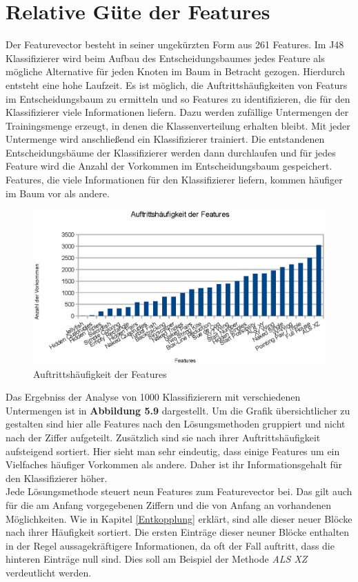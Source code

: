 \newpage
\section{Relative Güte der Features}
Der Featurevector besteht in seiner ungekürzten Form aus 261 Features. Im J48 Klassifizierer wird beim Aufbau des Entscheidungsbaumes jedes Feature als mögliche Alternative für jeden Knoten im Baum in Betracht gezogen. Hierdurch entsteht eine hohe Laufzeit. Es ist möglich, die Auftrittshäufigkeiten von Featurs im Entscheidungsbaum zu ermitteln und so Features zu identifizieren, die für den Klassifizierer viele Informationen liefern. Dazu werden zufällige Untermengen der Trainingsmenge erzeugt, in denen die Klassenverteilung erhalten bleibt. Mit jeder Untermenge wird anschließend ein Klassifizierer trainiert. Die entstandenen Entscheidungsbäume der Klassifizierer werden dann durchlaufen und für jedes Feature wird die Anzahl der Vorkommen im Entscheidungsbaum gespeichert. Features, die viele Informationen für den Klassifizierer liefern, kommen häufiger im Baum vor als andere.

\begin{figure}[H]
    \includegraphics[width=\textwidth,height=\textheight,keepaspectratio]{./img/features.eps}
    \caption{Auftrittshäufigkeit der Features}
\end{figure}

\noindent Das Ergebniss der Analyse von 1000 Klassifizierern mit verschiedenen Untermengen ist in \textbf{Abbildung 5.9} dargestellt. Um die Grafik übersichtlicher zu gestalten sind hier alle Features nach den Lösungsmethoden gruppiert und nicht nach der Ziffer aufgeteilt. Zusätzlich sind sie nach ihrer Auftrittshäufigkeit aufsteigend sortiert. Hier sieht man sehr eindeutig, dass einige Features um ein Vielfaches häufiger Vorkommen als andere. Daher ist ihr Informationsgehalt für den Klassifizierer höher.\\
Jede Lösungsmethode steuert neun Features zum Featurevector bei. Das gilt auch für die am Anfang vorgegebenen Ziffern und die von Anfang an vorhandenen Möglichkeiten. Wie in Kapitel \ref{Entkopplung} erklärt, sind alle dieser neuer Blöcke nach ihrer Häufigkeit sortiert. Die ersten Einträge dieser neuner Blöcke enthalten in der Regel aussagekräftigere Informationen, da oft der Fall auftritt, dass die hinteren Einträge null sind. Dies soll am Beispiel der Methode \textit{ALS XZ} verdeutlicht werden.

